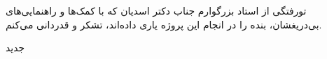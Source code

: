 


\begin{center}
\end{center}

‌تورفتگی از استاد بزرگوارم جناب دکتر اسدیان که با کمک‌ها و راهنمایی‌های بی‌دریغشان، بنده را در انجام این پروژه یاری داده‌اند، تشکر و قدردانی می‌کنم.

‌جدید
